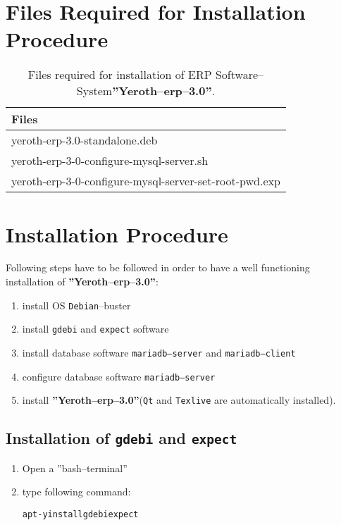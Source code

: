 \documentclass[a4paper, 10pt]{article}
\newcommand{\yerotherptroiszero}{\textbf{''Yeroth--erp--3.0''}\xspace}
\newcommand{\texlive}{\texttt{Texlive}\xspace}
\newcommand{\gdebi}{\texttt{gdebi}\xspace}
\newcommand{\expect}{\texttt{expect}\xspace}
\newcommand{\debian}{\texttt{Debian}\xspace}
\newcommand{\qt}{\texttt{Qt}\xspace}
\newcommand{\mariadbserver}{\texttt{mariadb--server}\xspace}
\newcommand{\mariadbclient}{\texttt{mariadb--client}\xspace}
\newcommand{\erp}{ERP Software--System\xspace}
\newcommand{\rootcommand}[1]{
\begin{center}
\textcolor{purplish}{#1\xspace}
\end{center}}
\begin{document}
\section{Files Required for Installation Procedure}

\begin{table}[!htbp]
\centering
\begin{tabular}{|l|} \hline
\textbf{Files}		\\ \hline
yeroth-erp-3.0-standalone.deb							\\ \hline
yeroth-erp-3-0-configure-mysql-server.sh				\\ \hline	
yeroth-erp-3-0-configure-mysql-server-set-root-pwd.exp	\\ \hline	
\end{tabular}
\caption{Files required for installation of
	 \erp \yerotherptroiszero.}
\label{tab:prerequisite-software}
\end{table}

\section{Installation Procedure}

Following steps have to be followed in order to have
a well functioning installation of \yerotherptroiszero:

\begin{enumerate} [1)]
	\item install OS \debian--buster
	\item install \gdebi and \expect software
	\item install database software \mariadbserver and \mariadbclient
	\item configure database software \mariadbserver
	\item install \yerotherptroiszero (\qt and \texlive are automatically installed).
\end{enumerate}

\subsection{Installation of \gdebi and \expect}

\begin{enumerate}[1)]
	\item Open a ''bash--terminal''
	\item type following command:
		\begin{alltt}
			\rootcommand{apt -y install gdebi expect}
		\end{alltt}
\end{enumerate} 
\end{document}
